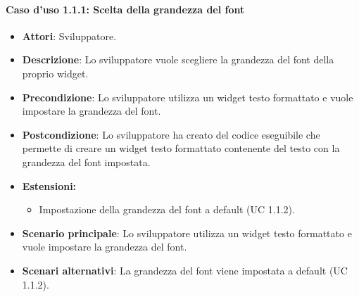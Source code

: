 \paragraph{Caso d'uso 1.1.1: Scelta della grandezza del font}
\begin{itemize}
\item\textbf{Attori}: Sviluppatore.
\item\textbf{Descrizione}: Lo sviluppatore vuole scegliere la grandezza del font della proprio widget.
\item\textbf{Precondizione}: Lo sviluppatore utilizza un widget testo formattato e vuole impostare la grandezza del font.
\item\textbf{Postcondizione}: Lo sviluppatore ha creato del codice eseguibile che permette di creare un widget testo formattato contenente del testo con la grandezza del font impostata.
\item\textbf{Estensioni:}
	\begin{itemize}
		\item Impostazione della grandezza del font a default (UC 1.1.2).
	\end{itemize}
\item\textbf{Scenario principale}: Lo sviluppatore utilizza un widget testo formattato e vuole impostare la grandezza del font. 
\item\textbf{Scenari alternativi}: La grandezza del font viene impostata a default (UC 1.1.2).
\end{itemize}